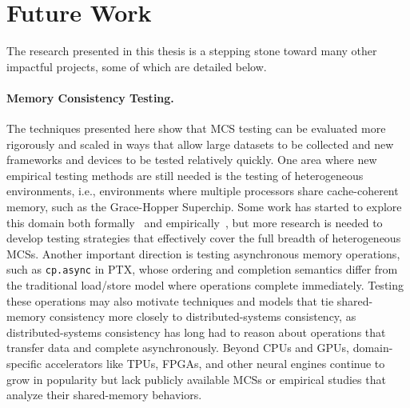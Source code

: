 \section{Future Work \label{sec:conclusion-future-work}}

The research presented in this thesis is a stepping stone toward many other impactful projects, some of which are detailed below.

\paragraph{Memory Consistency Testing.} The techniques presented here show that MCS testing can be evaluated more rigorously and scaled in ways that allow large datasets to be collected and new frameworks and devices to be tested relatively quickly. One area where new empirical testing methods are still needed is the testing of heterogeneous environments, i.e., environments where multiple processors share cache-coherent memory, such as the Grace-Hopper Superchip. Some work has started to explore this domain both formally~\cite{goens2023compound} and empirically~\cite{srivastava2024testing}, but more research is needed to develop testing strategies that effectively cover the full breadth of heterogeneous MCSs. Another important direction is testing asynchronous memory operations, such as \texttt{cp.async} in PTX, whose ordering and completion semantics differ from the traditional load/store model where operations complete immediately. Testing these operations may also motivate techniques and models that tie shared-memory consistency more closely to distributed-systems consistency, as distributed-systems consistency has long had to reason about operations that transfer data and complete asynchronously. Beyond CPUs and GPUs, domain-specific accelerators like TPUs, FPGAs, and other neural engines continue to grow in popularity but lack publicly available MCSs or empirical studies that analyze their shared-memory behaviors.

